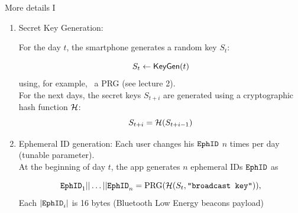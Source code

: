\documentclass[usenames,dvipsnames, 9pt]{beamer}
\begin{document}
\begin{frame}{More details I}
\begin{enumerate}
	\itemsep 1em
	\item  {\color{Orange}Secret Key Generation:}
	
	For the day $t$, the smartphone generates a random key $S_t $:
	
	\[S_t \leftarrow \textsf{KeyGen}(t)\]
	 using, for example, \ a PRG (see lecture 2). \\[5pt]
	 
	 For the next days, the secret keys $S_{t+i}$ are generated using a {\color{Orange}cryptographic hash function} $\mathcal{H}$:
	 \[
	 	S_{t+i} = \mathcal{H}(S_{t+i-1})
	 \]
	 \pause 
	 \item {\color{Orange} Ephemeral ID generation:}  Each user changes his $\mathtt{EphID}$ $n$ times per day (tunable parameter). \\
	 At the beginning of day $t$, the app generates $n$ ephemeral IDs  $\mathtt{EphID}$ as
	 
	 \[
	 	\mathtt{EphID}_1 || \ldots || \mathtt{EphID}_n = \text{PRG} (  \mathcal{H} (S_t, \texttt{``broadcast key''}) ),
	 \]
	 \pause 
	 Each $|\mathtt{EphID}_i|$ is 16 bytes (Bluetooth Low Energy beacons payload)
	 
\end{enumerate}
\end{frame}
\end{document}
